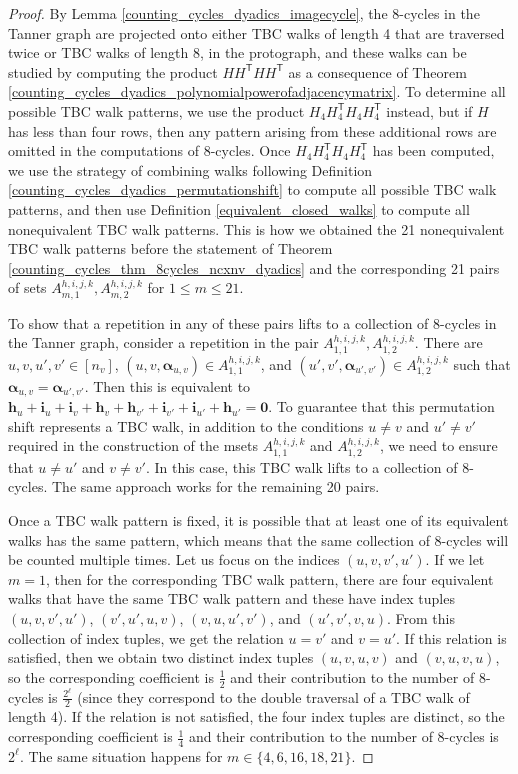 \documentclass[11pt]{article}
\theoremstyle{plain}
\theoremstyle{plain}
\theoremstyle{definition}
\numberwithin{theo}{section}
\newcommand{\bzero}{\mathbf{0}}
\newcommand{\bh}{{\mathbf h}}
\newcommand{\bi}{{\mathbf i}}
\newcommand{\balpha}{{\boldsymbol \alpha}}
\newcounter{alp}
\newcounter{ara}
\newcounter{rom}
\begin{document}
\begin{proof}
By Lemma \ref{counting_cycles_dyadics_imagecycle}, the 8-cycles in the Tanner graph are projected onto either TBC walks of length 4 that are traversed twice or TBC walks of length 8, in the protograph, and these walks can be studied by computing the product $HH^\mathsf{T}HH^\mathsf{T}$ as a consequence of Theorem \ref{counting_cycles_dyadics_polynomialpowerofadjacencymatrix}. To determine all possible TBC walk patterns, we use the product $H_4H_4^\mathsf{T}H_4H_4^\mathsf{T}$ instead, but if $H$ has less than four rows, then any pattern arising from these additional rows are omitted in the computations of 8-cycles. Once $H_4H_4^\mathsf{T}H_4H_4^\mathsf{T}$ has been computed, we use the strategy of combining walks following Definition \ref{counting_cycles_dyadics_permutationshift} to compute all possible TBC walk patterns, and then use Definition \ref{equivalent_closed_walks} to compute all nonequivalent TBC walk patterns. This is how we obtained the 21 nonequivalent TBC walk patterns before the statement of Theorem \ref{counting_cycles_thm_8cycles_ncxnv_dyadics} and the corresponding 21 pairs of sets $A_{m,1}^{h,i,j,k},A_{m,2}^{h,i,j,k}$ for $1\leq m\leq21$.

To show that a repetition in any of these pairs lifts to a collection of 8-cycles in the Tanner graph, consider a repetition in the pair $A_{1,1}^{h,i,j,k},A_{1,2}^{h,i,j,k}$. There are $u,v,u',v'\in[n_v]$, $(u,v,\balpha_{u,v})\in A_{1,1}^{h,i,j,k}$, and $(u',v',\balpha_{u',v'})\in A_{1,2}^{h,i,j,k}$ such that $\balpha_{u,v}=\balpha_{u',v'}$. Then this is equivalent to $\bh_u+\bi_u+\bi_v+\bh_v+\bh_{v'}+\bi_{v'}+\bi_{u'}+\bh_{u'}=\bzero$. To guarantee that this permutation shift represents a TBC walk, in addition to the conditions $u\neq v$ and $u'\neq v'$ required in the construction of the msets $A_{1,1}^{h,i,j,k}$ and $A_{1,2}^{h,i,j,k}$, we need to ensure that $u\neq u'$ and $v\neq v'$. In this case, this TBC walk lifts to a collection of 8-cycles. The same approach works for the remaining 20 pairs. 

Once a TBC walk pattern is fixed, it is possible that at least one of its  equivalent walks has the same pattern, which means that the same collection of 8-cycles will be counted multiple times. Let us focus on the indices $(u,v,v',u')$. If we let $m=1$, then for the corresponding TBC walk pattern, there are four equivalent walks that have the same TBC walk pattern and these have index tuples $(u,v,v',u')$, $(v',u',u,v)$, $(v,u,u',v')$, and $(u',v',v,u)$. From this collection of index tuples, we get the relation $u=v'$ and $v=u'$. If this relation is satisfied, then we obtain two distinct index tuples $(u,v,u,v)$ and $(v,u,v,u)$, so the corresponding coefficient is $\frac{1}{2}$ and their contribution to the number of 8-cycles is $\frac{2^\ell}{2}$ (since they correspond to the double traversal of a TBC walk of length 4). If the relation is not satisfied, the four index tuples are distinct, so the corresponding coefficient is $\frac{1}{4}$ and their contribution to the number of 8-cycles is $2^\ell$. The same situation happens for $m\in\{4,6,16,18,21\}$.


\end{proof}
\end{document}
